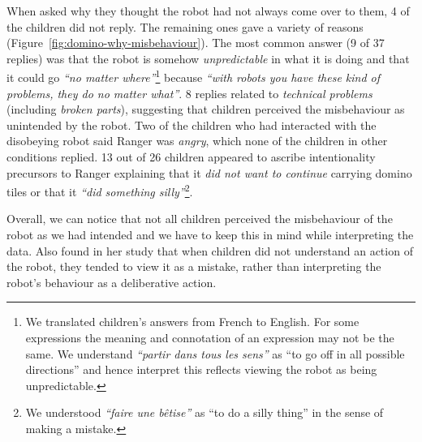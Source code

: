 \documentclass{sig-alternate}
\newcommand{\eg}{{\textit{e.g.~}}}
\begin{document}
When asked why they thought the robot had not always come over to them, 4 of the
children did not reply. The remaining ones gave a variety of reasons
(Figure~\ref{fig:domino-why-misbehaviour}). The most common answer (9 of 37
replies) was that the robot is somehow \textit{unpredictable} in what it is
doing and that it could go \textit{``no matter where''}\footnote{We translated
children's answers from French to English. For some expressions the meaning
and connotation of an expression may not be the same. We understand
\textit{``partir dans tous les sens''} as ``to go off in all possible
directions'' and hence interpret this reflects viewing the robot as being
unpredictable.} because \textit{``with robots you have these kind of problems,
they do no matter what''}. 8 replies related to \textit{technical problems}
(including \textit{broken parts}), suggesting that children perceived the
misbehaviour as unintended by the robot. Two of the children who had interacted
with the disobeying robot said Ranger was \textit{angry}, which none of the
children in other conditions replied. 13 out of 26 children appeared to ascribe
intentionality precursors to Ranger explaining that it \textit{did not want to
continue} carrying domino tiles or that it \textit{``did something
silly''}\footnote{We understood \textit{``faire une bêtise''} as ``to do a silly
thing'' in the sense of making a mistake.}.

Overall, we can notice that not all children perceived the misbehaviour of the
robot as we had intended and we have to keep this in mind while interpreting the
data. Also \cite{leite_long-term_2013} found in her study that when children did
not understand an action of the robot, they tended to view it as a mistake,
rather than interpreting the robot's behaviour as a deliberative action.


\end{document}
